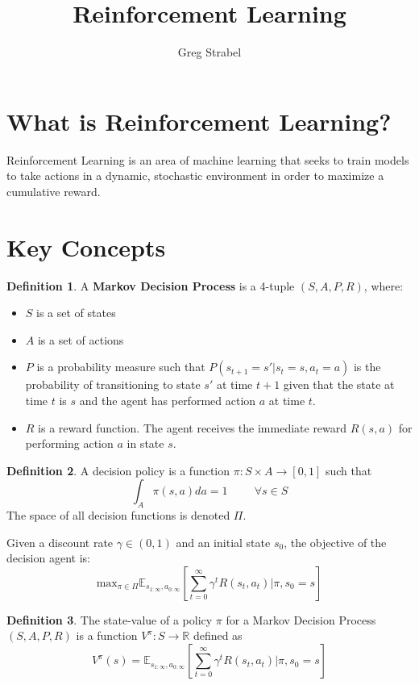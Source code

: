 \documentclass[11pt]{article}
\author{Greg Strabel}
\title{Reinforcement Learning}
\theoremstyle{definition}
\newtheorem{definition}{Definition}[section]
\begin{document}
\maketitle

\section{What is Reinforcement Learning?}

Reinforcement Learning is an area of machine learning that seeks to train models to take actions in a dynamic, stochastic environment in order to maximize a cumulative reward.

\section{Key Concepts}
\begin{definition} A \textbf{Markov Decision Process} is a 4-tuple $(S,A,P,R)$, where:
\begin{itemize}
\item $S$ is a set of states
\item $A$ is a set of actions
\item $P$ is a probability measure such that $P(s_{t+1}=s'| s_t=s, a_t=a)$ is the probability of transitioning to state $s'$ at time $t+1$ given that the state at time $t$ is $s$ and the agent has performed action $a$ at time $t$.
\item $R$ is a reward function. The agent receives the immediate reward $R(s,a)$ for performing action $a$ in state $s$. 
\end{itemize}
\end{definition}
\begin{definition} A decision policy is a function $\pi : S \times A \rightarrow [0,1]$ such that
\begin{equation}
\int_A \pi(s,a)da=1 \hspace{1cm} \forall s\in S
\end{equation}
The space of all decision functions is denoted $\Pi$.
\end{definition}
Given a discount rate $\gamma \in (0,1)$ and an initial state $s_0$, the objective of the decision agent is:
\begin{equation}
\mathrm{max}_{\pi \in \Pi} \mathbb{E}_{s_{1:\infty},a_{0:\infty}} \left[ \sum_{t=0}^{\infty} \gamma^t R(s_t, a_t) | \pi, s_0 = s \right]
\end{equation}
\begin{definition} The state-value of a policy $\pi$ for a Markov Decision Process $(S,A,P,R)$ is a function $V^{\pi} : S \rightarrow \mathbb{R}$ defined as
\begin{equation}
V^{\pi}(s) = \mathbb{E}_{s_{1:\infty},a_{0:\infty}} \left[ \sum_{t=0}^{\infty} \gamma^t R(s_t, a_t) | \pi, s_0 = s \right]
\end{equation}
\end{definition}
\end{document}
